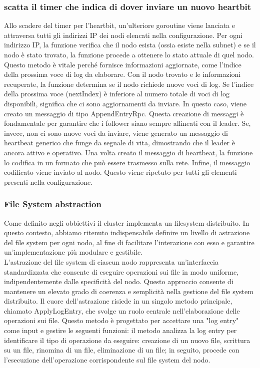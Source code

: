 \subsubsection{scatta il timer che indica di dover inviare un nuovo heartbit}
Allo scadere del timer per l'heartbit, un'ulteriore goroutine viene lanciata e attraversa tutti 
gli indirizzi IP dei nodi elencati nella configurazione. Per ogni indirizzo IP, la funzione 
verifica che il nodo esista (ossia esiste nella subnet) e se il nodo è stato trovato, la funzione 
procede a ottenere lo stato attuale di quel nodo. Questo metodo è vitale perché fornisce 
informazioni aggiornate, come l'indice della prossima voce di log da elaborare. 
Con il nodo trovato e le informazioni recuperate, la funzione determina se il nodo richiede nuove 
voci di log. Se l'indice della prossima voce (nextIndex) è inferiore al numero totale di voci di 
log disponibili, significa che ci sono aggiornamenti da inviare. 
In questo caso, viene creato un messaggio di tipo AppendEntryRpc.
Questa creazione di messaggi è fondamentale per garantire che i follower siano sempre allineati 
con il leader. Se, invece, non ci sono nuove voci da inviare, viene generato un messaggio di 
heartbeat generico che funge da segnale di vita, dimostrando che il leader è ancora attivo e 
operativo.
Una volta creato il messaggio di heartbeat, la funzione lo codifica in un formato che può essere 
trasmesso sulla rete.
Infine, il messaggio codificato viene inviato al nodo. 
Questo viene ripetuto per tutti gli elementi presenti nella configurazione.

\subsubsection{File System abstraction}
Come definito negli obbiettivi il cluster implementa un filesystem distribuito.
In questo contesto, abbiamo ritenuto indispensabile definire un livello di astrazione del file 
system per ogni nodo, al fine di facilitare l'interazione con esso e garantire un'implementazione 
più modulare e gestibile.\\
L'astrazione del file system di ciascun nodo rappresenta un'interfaccia standardizzata che consente di eseguire operazioni sui 
file in modo uniforme, indipendentemente dalle specificità del nodo. Questo approccio consente di mantenere
un elevato grado di coerenza e semplicità nella gestione del file system distribuito.
Il cuore dell'astrazione risiede in un singolo metodo principale, chiamato ApplyLogEntry, che svolge un ruolo centrale nell'elaborazione
delle operazioni sui file. Questo metodo è progettato per accettare una "log entry" come input e 
gestire le seguenti funzioni: il metodo analizza la log entry per identificare il tipo di operazione da eseguire: creazione 
di un nuovo file, scrittura su un file, rinomina di un file, eliminazione di un file; in seguito, procede con 
l'esecuzione dell'operazione corrispondente sul file system del nodo.

